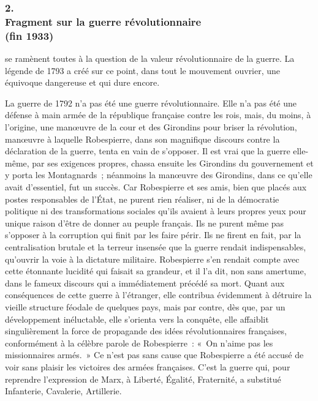 \documentclass[french,twoside]{book} %
\begin{document}
\subsubsection[{2. Fragment sur la guerre révolutionnaire, (fin 1933)}]{2. \\
Fragment sur la guerre révolutionnaire \\
(fin 1933)}
\noindent \par
[Ces questions] se ramènent toutes à la question de la valeur révolution­naire de la guerre. La légende de 1793 a créé sur ce point, dans tout le mouvement ouvrier, une équivoque dangereuse et qui dure encore.\par
La guerre de 1792 n'a pas été une guerre révolutionnaire. Elle n'a pas été une défense à main armée de la république française contre les rois, mais, du moins, à l'origine, une manœuvre de la cour et des Girondins pour briser la révolution, manœuvre à laquelle Robespierre, dans son magnifique discours contre la déclaration de la guerre, tenta en vain de s'opposer. Il est vrai que la guerre elle-même, par ses exigences propres, chassa ensuite les Girondins du gouvernement et y porta les Montagnards ; néanmoins la manœuvre des Girondins, dans ce qu'elle avait d'essentiel, fut un succès. Car Robespierre et ses amis, bien que placés aux postes responsables de l'État, ne purent rien réaliser, ni de la démocratie politique ni des transformations sociales qu'ils avaient à leurs propres yeux pour unique raison d'être de donner au peuple français. Ils ne purent même pas s'opposer à la corruption qui finit par les faire périr. Ils ne firent en fait, par la centralisation brutale et la terreur insensée que la guerre rendait indispensables, qu'ouvrir la voie à la dictature militaire. Robespierre s'en rendait compte avec cette étonnante lucidité qui faisait sa grandeur, et il l'a dit, non sans amertume, dans le fameux discours qui a immédiatement précédé sa mort. Quant aux conséquences de cette guerre à l'étranger, elle contribua évidemment à détruire la vieille structure féodale de quelques pays, mais par contre, dès que, par un développement inéluctable, elle s'orienta vers la conquête, elle affaiblit singulièrement la force de propagande des idées révolutionnaires françaises, conformément à la célèbre parole de Robespierre : « On n'aime pas les missionnaires armés. » Ce n'est pas sans cause que Robespierre a été accusé de voir sans plaisir les victoires des armées françaises. C'est la guerre qui, pour reprendre l'expression de Marx, à Liberté, Égalité, Fraternité, a substitué Infanterie, Cavalerie, Artillerie.\par
\end{document}
